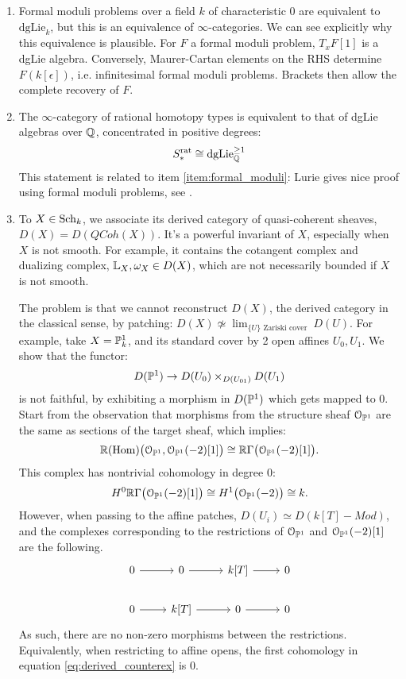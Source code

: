 \documentclass[10pt,a4paper,reqno,oneside]{book} %
\theoremstyle{plain}
\theoremstyle{definition}
\theoremstyle{remark}
\numberwithin{equation}{section}
\begin{document}
\begin{enumerate}
\item \label{item:formal_moduli}
Formal moduli problems over a field $k$ of characteristic 0 are equivalent to $\text{dgLie}_{k}$, but this is
an equivalence of $\infty$-categories. We can see explicitly why this equivalence is plausible. For $F$ a formal moduli problem, 
$T_xF[1]$ is a dgLie algebra. Conversely, Maurer-Cartan elements on the RHS determine $F(k[\epsilon])$, 
i.e. infinitesimal formal moduli problems. Brackets then allow the complete recovery of $F$. 

\item 
The $\infty$-category of rational homotopy types is equivalent to that of dgLie algebras over $\mathbb Q$, concentrated in
positive degrees:
\[	S_*^{\text{rat}} \cong \text{dgLie}_{\mathbb Q}^{\geq 1}	\] 
This statement is related to item \ref{item:formal_moduli}: Lurie gives nice proof using formal moduli problems, see 
\cite{DAG-XIII}.

\item To $X \in \mathrm{Sch}_k$, we associate its derived category of quasi-coherent sheaves, $D(X) = D(QCoh(X))$. 
It's a powerful invariant of $X$, especially when $X$ is not
smooth. For example, it contains the cotangent complex and dualizing complex, $\mathbb L_X , \omega_X \in D(X)$, which are not 
necessarily bounded if $X$ is not smooth.

The problem is that we cannot reconstruct $D(X)$, the derived category in the classical sense, by patching: $D(X) \not \simeq 
\lim_{\{U\} \text{ Zariski cover }} D(U)$. For example, take $X = \mathbb P^1_k$, and its standard cover by 2 open affines $U_0, U_1$.
We show that the functor:
\[	D(\mathbb P^1) \to D(U_0) \times_{D(U_{01})} D(U_1)	\]
is not faithful, by exhibiting a morphism in $D(\mathbb P^1)$ which gets mapped to 0. Start from the observation that morphisms
from the structure sheaf $\mathcal{O}_{\mathbb P^1}$ are the same as sections of the target sheaf, which implies:
\[	\mathbb R(\operatorname{Hom}) \big(\mathcal{O}_{\mathbb P^1},\mathcal{O}_{\mathbb P^1}(-2)[1]\big) \cong \mathbb R \Gamma\big(\mathcal{O}_{\mathbb P^1}(-2)[1]\big) .	\]
This complex has nontrivial cohomology in degree 0:
\begin{equation}
\label{eq:derived_counterex}
	H^0 \mathbb R \Gamma\big(\mathcal{O}_{\mathbb P^1}(-2)[1]\big) \cong H^1\big(\mathcal{O}_{\mathbb P^1}(-2)\big) \cong k.
\end{equation}
However, when passing to the affine patches, $D(U_i) \simeq D(k[T]-Mod)$, and the complexes corresponding to the
restrictions of $\mathcal{O}_{\mathbb P^1}$ and $\mathcal{O}_{\mathbb P^1}(-2)[1]$ are the following.
\[
\begin{tikzcd}
0\arrow{r} & 0\arrow{r} & k[T]\arrow{r} & 0 \\
0\arrow{r} & k[T]\arrow{r} & 0\arrow{r} & 0
\end{tikzcd}
\]
As such, there are no non-zero morphisms between the restrictions. Equivalently, when restricting to affine opens,
the first cohomology in equation \ref{eq:derived_counterex} is 0.


\end{enumerate}
\end{document}
